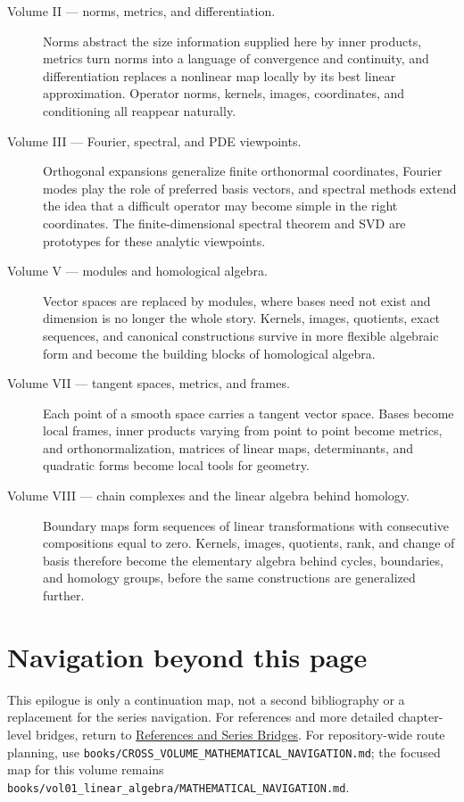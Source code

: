\begin{description}
\item[Volume II --- norms, metrics, and differentiation.]
Norms abstract the size information supplied here by inner products, metrics
turn norms into a language of convergence and continuity, and differentiation
replaces a nonlinear map locally by its best linear approximation. Operator
norms, kernels, images, coordinates, and conditioning all reappear naturally.

\item[Volume III --- Fourier, spectral, and PDE viewpoints.]
Orthogonal expansions generalize finite orthonormal coordinates, Fourier modes
play the role of preferred basis vectors, and spectral methods extend the idea
that a difficult operator may become simple in the right coordinates. The
finite-dimensional spectral theorem and SVD are prototypes for these analytic
viewpoints.

\item[Volume V --- modules and homological algebra.]
Vector spaces are replaced by modules, where bases need not exist and dimension
is no longer the whole story. Kernels, images, quotients, exact sequences, and
canonical constructions survive in more flexible algebraic form and become the
building blocks of homological algebra.

\item[Volume VII --- tangent spaces, metrics, and frames.]
Each point of a smooth space carries a tangent vector space. Bases become local
frames, inner products varying from point to point become metrics, and
orthonormalization, matrices of linear maps, determinants, and quadratic forms
become local tools for geometry.

\item[Volume VIII --- chain complexes and the linear algebra behind homology.]
Boundary maps form sequences of linear transformations with consecutive
compositions equal to zero. Kernels, images, quotients, rank, and change of
basis therefore become the elementary algebra behind cycles, boundaries, and
homology groups, before the same constructions are generalized further.
\end{description}

\section*{Navigation beyond this page}
This epilogue is only a continuation map, not a second bibliography or a
replacement for the series navigation. For references and more detailed
chapter-level bridges, return to
\hyperref[sec:i-references-and-series-bridges]{References and Series Bridges}.
For repository-wide route planning, use
\texttt{books/CROSS\_VOLUME\_MATHEMATICAL\_NAVIGATION.md}; the focused map for
this volume remains
\texttt{books/vol01\_linear\_algebra/MATHEMATICAL\_NAVIGATION.md}.

